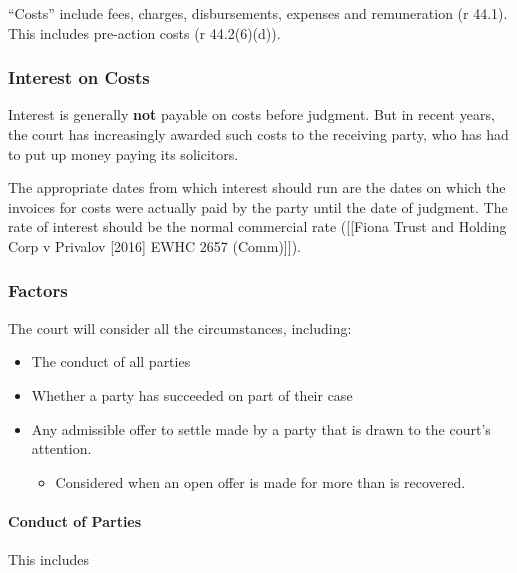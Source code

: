 \documentclass[
]{article}
\providecommand{\tightlist}{%
  \setlength{\itemsep}{0pt}\setlength{\parskip}{0pt}}
\begin{document}
``Costs'' include fees, charges, disbursements, expenses and
remuneration (r 44.1). This includes pre-action costs (r 44.2(6)(d)).

\hypertarget{interest-on-costs}{%
\subsubsection{Interest on Costs}\label{interest-on-costs}}

Interest is generally \textbf{not} payable on costs before judgment. But
in recent years, the court has increasingly awarded such costs to the
receiving party, who has had to put up money paying its solicitors.

The appropriate dates from which interest should run are the dates on
which the invoices for costs were actually paid by the party until the
date of judgment. The rate of interest should be the normal commercial
rate ({[}{[}Fiona Trust and Holding Corp v Privalov {[}2016{]} EWHC 2657
(Comm){]}{]}).

\hypertarget{factors}{%
\subsubsection{Factors}\label{factors}}

The court will consider all the circumstances, including:

\begin{itemize}
\tightlist
\item
  The conduct of all parties
\item
  Whether a party has succeeded on part of their case
\item
  Any admissible offer to settle made by a party that is drawn to the
  court's attention.

  \begin{itemize}
  \tightlist
  \item
    Considered when an open offer is made for more than is recovered.
  \end{itemize}
\end{itemize}

\hypertarget{conduct-of-parties}{%
\paragraph{Conduct of Parties}\label{conduct-of-parties}}

This includes
\end{document}
